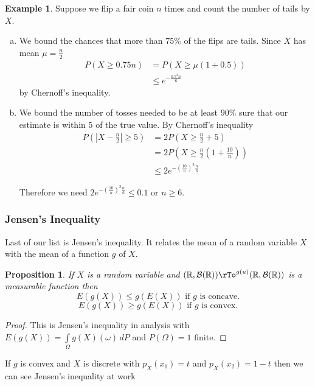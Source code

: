 \documentclass[12pt]{amsart}
\newtheorem{proposition}[theorem]{Proposition}
\theoremstyle{definition}
\newtheorem{example}[theorem]{Example}
\begin{document}
\begin{example} Suppose we flip a fair coin $n$ times and count the number of tails by $X$.
\begin{enumerate}[a.]
\item We bound the chances that more than $75\%$ of the flips are tails. Since $X$ has mean $\mu = \frac{n}{2}$
\begin{align*}
P(X \geq 0.75n) & = P(X \geq \mu(1+0.5)) \\
 & \leq e^{-\frac{0.5^2n}{6}}
\end{align*}
by Chernoff's inequality.
\item We bound the number of tosses needed to be at least $90\%$ sure that our estimate is within 5 of the true value. By Chernoff's inequality
\begin{align*}
P \left( |X - \frac{n}{2}| \geq 5 \right) & = 2P \left(X \geq \frac{n}{2} + 5 \right) \\
 & = 2P \left(X \geq \frac{n}{2} \left(1 + \frac{10}{n} \right) \right) \\
 & \leq 2e^{- \left( \frac{10}{n} \right)^2\frac{n}{6}}
\end{align*}

Therefore we need $2e^{- \left( \frac{10}{n} \right)^2\frac{n}{6}} \leq 0.1$ or $n \geq 6$.
\end{enumerate}
\end{example}

\subsubsection{Jensen's Inequality} Last of our list is Jensen's inequality. It relates the mean of a random variable $X$ with the mean of a function $g$ of $X$.

\begin{proposition} If $X$ is a random variable and $(\mathbb{R}, \mathcal{B}(\mathbb{R})) \rTo^{g(u)} (\mathbb{R}, \mathcal{B}(\mathbb{R}))$ is a measurable function then 
$$E(g(X)) \leq g(E(X)) \text{ if } g \text{ is concave.}$$
$$E(g(X)) \geq g(E(X)) \text{ if } g \text{ is convex.}$$
\end{proposition}
\begin{proof} This is Jensen's inequality in analysis with $E(g(X)) = \int\limits_{\Omega} g(X)(\omega) \, dP$ and $P(\Omega) = 1$ finite.
\end{proof}

If $g$ is convex and $X$ is discrete with $p_X(x_1) = t$ and $p_X(x_2) = 1- t$ then we can see Jensen's inequality at work
\end{document}
